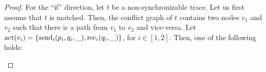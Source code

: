 \begin{proof}
For the ``if'' direction, let $t$ be a non-synchronizable trace. Let us first assume that $t$ is matched. Then, the conflict graph of $t$ contains two nodes $v_1$ and $v_2$ such that there is a path from $v_1$ to $v_2$ and vice-versa. 
%
%
%
%
%
%
%
%
Let $\mathrm{act}(v_i)=\{\mathrm{send}_{i}({p_i,q_i,\_}), \mathrm{rec}_{i}({q_i,\_})\}$, for $i\in [1,2]$. Then, one of the following holds:
	\begin{itemize}

\end{itemize}
\end{proof}
